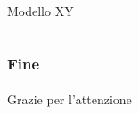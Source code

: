 \begin{frame}
\begin{columns}
\begin{column}{0.33\textwidth}
\begin{block}{Modello XY}
            \end{block}        
        \end{column}
    \end{columns}

\end{frame}



\begin{frame}
    \frametitle{Fine}
    \framesubtitle{}

    \begin{center}
        Grazie per l'attenzione
    \end{center}
    
\end{frame}